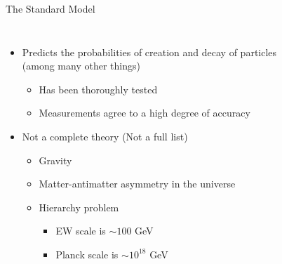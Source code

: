 \documentclass[aspectratio=169,xcolor=table]{beamer}
\begin{document}
  \begin{frame}[c]{The Standard Model}
    \begin{columns}
      \small
      \begin{itemize}
        \item Predicts the probabilities of creation and decay of particles (among many other things)
        \begin{itemize}
          \item Has been thoroughly tested
          \item Measurements agree to a high degree of accuracy
        \end{itemize}
        \item Not a complete theory ({\footnotesize Not a full list})
        \begin{itemize}
          \item Gravity
          \item Matter-antimatter asymmetry in the universe
          \item Hierarchy problem
            \begin{itemize}
              \item EW scale is $\sim 100$ GeV
              \item Planck scale is $\sim 10^{18}$ GeV
            \end{itemize}
        \end{itemize}
      \end{itemize}
      \begin{figure}
        \centering

\end{figure}
\end{columns}
\end{frame}
\end{document}
